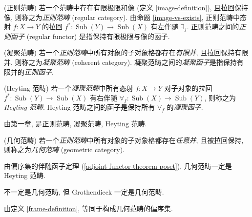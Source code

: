 \begin{definition}
	{(正则范畴)}
	若一个范畴中存在有限极限和像 (定义 \ref{image-definition}), 且拉回保持像, 则称之为\emph{正则范畴} (regular category).
	由命题 \ref{image-vs-exists}, 正则范畴中态射 $f\colon X\to Y$ 的拉回 $f^*\colon \operatorname{Sub}(Y)\to \operatorname{Sub}(X)$ 有左伴随 $\exists_f$.
	正则范畴之间的\emph{正则函子} (regular functor) 是指保持有限极限与像的函子.
\end{definition}

\begin{definition}
	[label={coherent-category}]
	{(凝聚范畴)}
	若一个\emph{正则范畴}中所有对象的子对象格都存在\emph{有限并}, 且拉回保持有限并, 则称之为\emph{凝聚范畴} (coherent category).
	凝聚范畴之间的\emph{凝聚函子}是指保持有限并的\emph{正则函子}.
\end{definition}

\begin{definition}
	[label={Heyting-category}]
	{(Heyting 范畴)}
	若一个\emph{凝聚范畴}中所有态射 $f\colon X\to Y$ 对子对象的拉回 $f^*\colon \operatorname{Sub}(Y)\to\operatorname{Sub}(X)$ 有右伴随 $\forall_f\colon \operatorname{Sub}(X)\to \operatorname{Sub}(Y)$, 则称之为 \emph{Heyting 范畴}.
	Heyting 范畴之间的函子是保持所有 $\forall_f$ 的\emph{凝聚函子}.
\end{definition}

由第一章, \topos{}是正则范畴, 凝聚范畴, Heyting 范畴.

\begin{definition}
	{(几何范畴)}
	若一个\emph{正则范畴}中所有对象的子对象格都存在\emph{任意并}, 且被拉回保持, 则称之为\emph{几何范畴} (geometric category).
\end{definition}

由偏序集的伴随函子定理 (\ref{adjoint-functor-theorem-poset}), 几何范畴一定是 Heyting 范畴.

\topos{}不一定是几何范畴, 但 Grothendieck \topos{}一定是几何范畴.

由定义 \ref{frame-definition}, \fm{}等同于构成几何范畴的偏序集.


